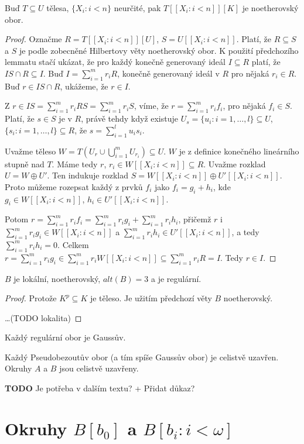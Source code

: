 \documentclass[11pt,a4paper]{article}
\theoremstyle{definition}
\theoremstyle{plain}
\begin{document}
\lemma Buď $T \subseteq U$ tělesa, $\{X_i: i < n\}$ neurčité, pak $T[[X_i: i <
n]][K]$ je noetherovský obor.
\begin{proof}
	Označme $R = T[[X_i: i < n]][U]$, $S = U[[X_i: i < n]]$. Platí, že $R
	\subseteq S$ a $S$ je podle zobecněné Hilbertovy věty noetherovský obor. K
	použití předchozího lemmatu stačí ukázat, že pro každý konečně generovaný
	ideál $I \subseteq R$ platí, že $IS \cap R \subseteq I$. Buď $I = \sum_{i =
	1}^m r_i R$, konečně generovaný ideál v $R$ pro nějaká $r_i \in R$. Buď $r
	\in IS \cap R$, ukážeme, že $r \in I$.

	Z $r \in IS = \sum_{i = 1}^m r_i RS = \sum_{i = 1}^m r_i S$, víme, že $r =
	\sum_{i = 1}^m r_i f_i$, pro nějaká $f_i \in S$. Platí, že $s \in S$ je v
	$R$, právě tehdy když existuje $U_s = \{u_i: i = 1, \dots, l\} \subseteq U$, $\{s_i:
	i = 1, \dots, l\} \subseteq R$, že $s = \sum_{i = 1}^l u_i s_i$.

	Uvažme těleso $W = T(U_r \cup \bigcup_{i = 1}^m U_{r_i}) \subseteq U$. $W$ je
	z definice konečného lineárního stupně nad $T$. Máme tedy $r$, $r_i \in
	W[[X_i: i < n]] \subseteq R$. Uvažme rozklad $U = W \oplus U'$. Ten
	indukuje rozklad $S = W[[X_i: i < n]] \oplus U'[[X_i: i < n]]$. Proto
	můžeme rozepsat každý z prvků $f_i$ jako $f_i = g_i + h_i$, kde $g_i \in
	W[[X_i: i < n]]$, $h_i \in U'[[X_i: i < n]]$.

	Potom $r = \sum_{i = 1}^m r_i f_i = \sum_{i = 1}^m r_i g_i + \sum_{i = 1}^m
	r_i h_i$, přičemž $r$ i $\sum_{i = 1}^m r_i g_i \in W[[X_i: i < n]]$ a
	$\sum_{i = 1}^m r_i h_i \in U'[[X_i: i < n]]$, a tedy $\sum_{i = 1}^m r_i h_i
	= 0$. Celkem $r = \sum_{i = 1}^m r_i g_i \in \sum_{i = 1}^m r_i W[[X_i: i <
	n]] \subseteq \sum_{i = 1}^m r_i R = I$. Tedy $r \in I$.
\end{proof}

\veta $B$ je lokální, noetherovský, $alt(B) = 3$ a je regulární.
\begin{proof}
Protože $K^p \subseteq K$ je těleso. Je užitím předchozí věty $B$ noetherovský.

\dots (TODO lokalita)
\end{proof}

\tvrzeni[Fakt] Každý regulární obor je Gaussův.

\tvrzeni[Fakt] Každý Pseudobezoutův obor (a tím spíše Gaussův obor) je celistvě
uzavřen.
\dusledek Okruhy $A$ a $B$ jsou celistvě uzavřeny.

\textbf{TODO} Je potřeba v dalším textu? + Přidat důkaz?

\section{Okruhy $B[b_0]$ a $B[b_i : i < \omega]$}
\end{document}
